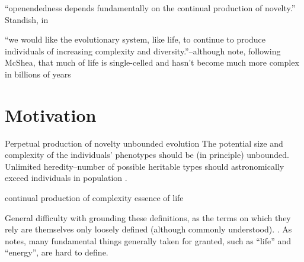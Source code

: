 ``openendedness depends fundamentally on the continual production of novelty.'' Standish, in \parencite{Soros2014}

``we would like the evolutionary system, like life, to continue to produce individuals of increasing complexity and diversity.''--although note, following McShea, that much of life is single-celled and hasn't become much more complex in billions of years \parencite{Maley1999}


\section{Motivation}

Perpetual production of novelty
unbounded evolution
The potential size and complexity of the individuals' phenotypes should be (in principle) unbounded.  \parencite{Soros2014}
Unlimited heredity--number of possible heritable types should astronomically exceed individuals in population \parencite{Vasas2015}.

continual production of complexity
essence of life

General difficulty with grounding these definitions, as the terms on which they rely are themselves only loosely defined (although commonly understood). \parencite{BanzhafBaumgaertnerBeslonEtAl2016}. As \textcite{Gayon2010} notes, many fundamental things generally taken for granted, such as ``life'' and ``energy'', are hard to define. 

